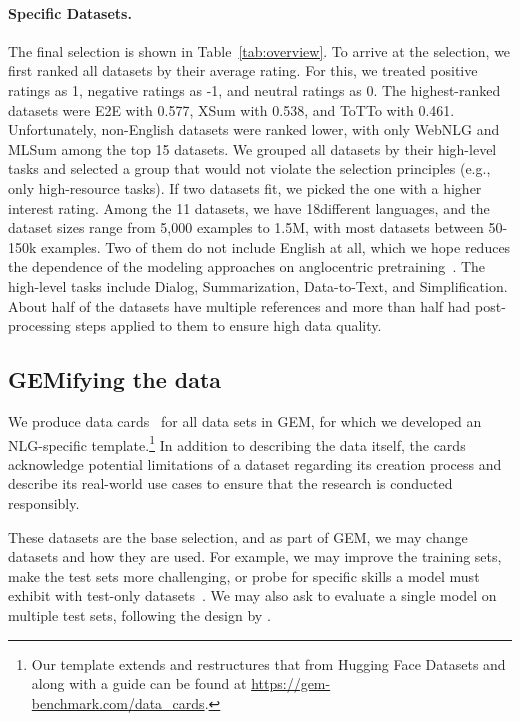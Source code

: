 \documentclass[11pt,a4paper]{article}
\newcommand{\GEM}{\textsc{GEM}}
\begin{document}
\paragraph{Specific Datasets.} The final selection is shown in Table~\ref{tab:overview}. To arrive at the selection, we first ranked all datasets by their average rating. For this, we treated positive ratings as 1, negative ratings as -1, and neutral ratings as 0. The highest-ranked datasets were E2E with 0.577, XSum with 0.538, and ToTTo with 0.461. Unfortunately, non-English datasets were ranked lower, with only WebNLG and MLSum among the top 15 datasets. 
We grouped all datasets by their high-level tasks and selected a group that would not violate the selection principles (e.g., only high-resource tasks). If two datasets fit, we picked the one with a higher interest rating. 
Among the 11 datasets, we have 18different languages, and the dataset sizes range from 5,000 examples to 1.5M, with most datasets between 50-150k examples. Two of them do not include English at all, which we hope reduces the dependence of the modeling approaches on anglocentric pretraining~\citep{anastasopoulos2020cross}. The high-level tasks include Dialog, Summarization, Data-to-Text, and Simplification. About half of the datasets have multiple references and more than half had post-processing steps applied to them to ensure high data quality. 


\subsection{GEMifying the data}
We produce data cards~\citep{bender2018data,gebru2018datasheets} for all data sets in \GEM, for which we developed an NLG-specific template.\footnote{Our template extends and restructures that from Hugging Face Datasets and along with a guide can be found at \url{https://gem-benchmark.com/data_cards}.} In addition to describing the data itself, the cards acknowledge potential limitations of a dataset regarding its creation process and describe its real-world use cases to ensure that the research is conducted responsibly.

These datasets are the base selection, and as part of \GEM, we may change datasets and how they are used. For example, we may improve the training sets, make the test sets more challenging, or probe for specific skills a model must exhibit with test-only datasets~\citep{perez2017analysing,linzen2020accelerate,ribeiro-etal-2020-beyond,schlegel2020beyond}. 
We may also ask to evaluate a single model on multiple test sets, following the design by \citet{dua2019orb}.
\end{document}
